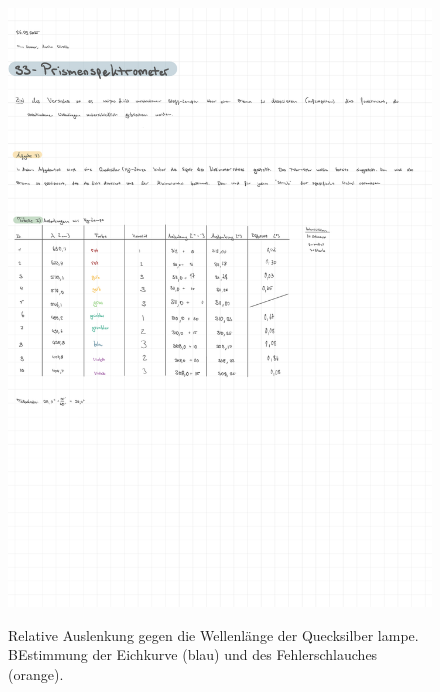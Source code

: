 \onecolumn
\begin{figure}
    \centering
    \includegraphics[width=\textwidth, page=3]{Protokolle/33/Chapter/Messprotokoll.pdf}
    \label{fig:Eichkurve}
    \caption{Relative Auslenkung gegen die Wellenlänge der Quecksilber lampe. BEstimmung der Eichkurve (blau) und des Fehlerschlauches (orange).}
\end{figure}

